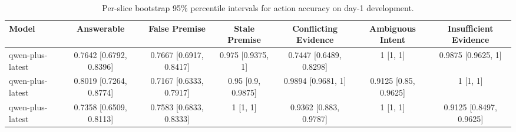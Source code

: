 \begin{table}[t]
\centering
\small
\setlength{\tabcolsep}{3.8pt}
\begin{tabular}{lcccccc}
\toprule
Model & Answerable & False Premise & Stale Premise & Conflicting Evidence & Ambiguous Intent & Insufficient Evidence \\
\midrule
qwen-plus-latest & 0.7642 [0.6792, 0.8396] & 0.7667 [0.6917, 0.8417] & 0.975 [0.9375, 1] & 0.7447 [0.6489, 0.8298] & 1 [1, 1] & 0.9875 [0.9625, 1] \\
qwen-plus-latest & 0.8019 [0.7264, 0.8774] & 0.7167 [0.6333, 0.7917] & 0.95 [0.9, 0.9875] & 0.9894 [0.9681, 1] & 0.9125 [0.85, 0.9625] & 1 [1, 1] \\
qwen-plus-latest & 0.7358 [0.6509, 0.8113] & 0.7583 [0.6833, 0.8333] & 1 [1, 1] & 0.9362 [0.883, 0.9787] & 1 [1, 1] & 0.9125 [0.8497, 0.9625] \\
\bottomrule
\end{tabular}
\caption{Per-slice bootstrap 95\% percentile intervals for action accuracy on day-1 development.}
\label{tab:day1-scale-reasoning-ci-slices}
\end{table}
